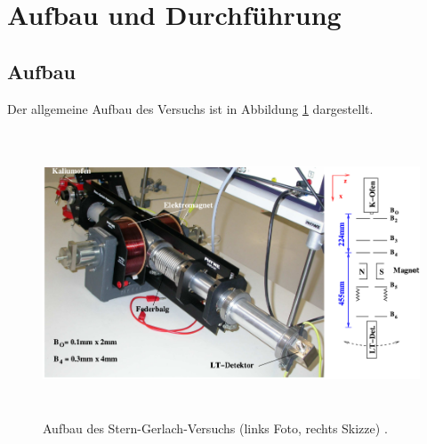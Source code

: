 \section{Aufbau und Durchführung}
\subsection{Aufbau}
\label{sec:Aufbau}

Der allgemeine Aufbau des Versuchs ist in Abbildung \ref{fig:aufbau1} dargestellt.
\begin{figure}
  \centering
  \includegraphics[height=8.5cm]{ressources/aufbau.png}
  \caption{Aufbau des Stern-Gerlach-Versuchs (links Foto, rechts Skizze) \cite{skript}.}
  \label{fig:aufbau1}
\end{figure}


